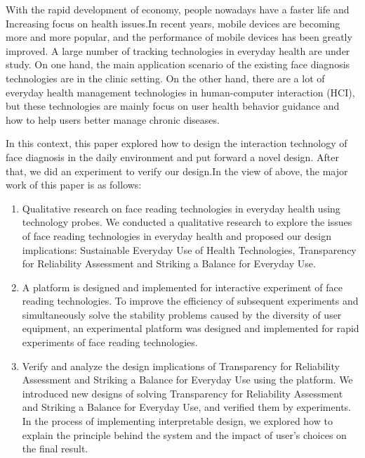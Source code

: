 \documentclass[type=master]{fduthesis}
\begin{document}
\begin{abstract*}

With the rapid development of economy, people nowadays have a faster life and Increasing focus on health issues.In recent years, mobile devices are becoming more and more popular, and the performance of mobile devices has been greatly improved. A large number of tracking technologies in everyday health are under study. On one hand, the main application scenario of the existing face diagnosis technologies are in the clinic setting. On the other hand, there are a lot of everyday health management technologies in human-computer interaction (HCI), but these technologies are mainly focus on user health behavior guidance and how to help users better manage chronic diseases.
  
In this context, this paper explored how to design the interaction technology of face diagnosis in the daily environment and put forward a novel design. After that, we did an experiment to verify our design.In the view of above, the major work of this paper is as follows:
  
  \begin{enumerate}
  
  \item Qualitative research on face reading technologies in everyday health using technology probes.
We conducted a qualitative research to explore the issues of face reading technologies in everyday health and proposed our design implications: Sustainable Everyday Use of Health Technologies, Transparency for Reliability Assessment and Striking a Balance for Everyday Use.
  
  \item A platform is designed and implemented for interactive experiment of face reading technologies.
To improve the efficiency of subsequent experiments and simultaneously solve the stability problems caused by the diversity of user equipment, an experimental platform was designed and implemented for rapid experiments of face reading technologies.
  
    \item Verify and analyze the design implications of Transparency for Reliability Assessment and Striking a Balance for Everyday Use using the platform.
We introduced new designs of solving Transparency for Reliability Assessment and Striking a Balance for Everyday Use, and verified them by experiments.
In the process of implementing interpretable design, we explored how to explain the principle behind the system and the impact of user's choices on the final result.

  \end{enumerate}
\end{abstract*}
\end{document}
